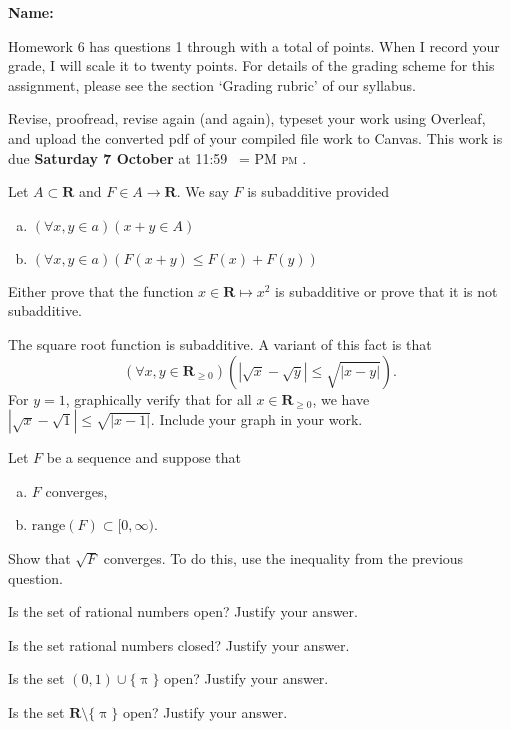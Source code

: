 \documentclass[12pt,fleqn,answers]{exam}
\makeatletter
\newcommand{\reals}{\mathbf{R}}
\newcommand{\range}{\mathrm{range}}
\newenvironment{alphalist}{
  \begin{enumerate}[(a)]
    \addtolength{\itemsep}{-0.5\itemsep}}
  {\end{enumerate}}
\newcommand{\quiz}{6}
\newcommand{\term}{Fall}
\DeclareRobustCommand{\maybefakesc}[1]{%
  \ifnum\pdfstrcmp{\f@series}{\bfdefault}=\z@
    {\fontsize{\dimexpr0.8\dimexpr\f@size pt\relax}{0}\selectfont\uppercase{#1}}%
  \else
    \textsc{#1}%
  \fi
}
\newcommand\PM{\,\maybefakesc{pm}\xspace}
\makeatother
\begin{document}
\large
\vspace{0.1in}
\noindent{}
{\bf Name:}  \\
\noindent \makebox[3.0truein][l]{\textbf{Homework \quiz, \term \/ \the\year}}
\vspace{0.1in}

\noindent  Homework \quiz\/  has questions 1 through  \numquestions \/ with a total 
of  \numpoints\/  points. When I record your grade, I will scale it to twenty points. 
For details of the grading scheme for this assignment, please see the section 
`Grading rubric' of our syllabus.

Revise, proofread, revise again (and again), typeset your work using Overleaf, and 
upload the converted pdf of your compiled file work to Canvas.  
This work is due \textbf{Saturday 7 October} at 11:59 \PM.

\vspace{0.1in}

\noindent Let $A \subset \reals$ and $F \in A \to \reals$.  We say $F$ is subadditive provided
\begin{alphalist}
\item $\left(\forall x,y \in a \right) \left(x+y \in A\right)$
\item $\left(\forall x,y \in a \right) \left(F(x+y) \leq F(x) + F(y)\right)$
\end{alphalist}
\begin{questions}

\question [10] Either prove that the function $x \in \reals \mapsto x^2$ is subadditive
or prove that it is not subadditive.

\question [10] The square root function is subadditive. A variant of this fact is that
\begin{equation*}
    \left(\forall x,y \in \reals_{\geq 0} \right)
    \left( | \sqrt{x} - \sqrt{y} | \leq \sqrt{|x-y|} \right).
\end{equation*}
For $y=1$, graphically verify that for all $x \in \reals_{\geq 0}$, we have
$ | \sqrt{x} - \sqrt{1} | \leq \sqrt{|x-1|}$. Include your graph in your work.


\question [10] Let $F$ be a sequence and suppose that 
\begin{alphalist}
\item $F$ converges,
\item $\range(F) \subset [0,\infty)$.
\end{alphalist}
Show that $\sqrt{F}$ converges. To do this, use the inequality from the previous question.

\question[10] Is the set of rational numbers open? Justify your answer.

\question[10] Is the set rational numbers closed? Justify your answer.

\question [10] Is the set $(0,1) \cup \{\uppi\}$ open? Justify your answer.

\question [10] Is the set $\reals \setminus \{\uppi\}$ open? Justify your answer.

\end{questions}
\end{document}
